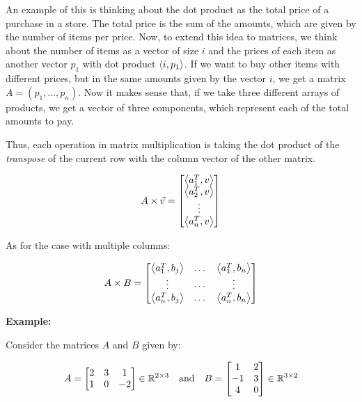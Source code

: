 An example of this is thinking about the dot product as the total price of a purchase in a store.
The total price is the sum of the amounts, which are given by the number of items per price. Now, to extend this idea
to matrices, we think about the number of items as a vector of size \(i\) and the prices of each item as
another vector \(p_1\) with dot product \(\left\langle i, p_1\right\rangle\). If we want to buy other items with different prices, but in the
same amounts given by the vector \(i\), we get a matrix \(A = (p_1, \dots, p_n)\). Now it makes sense that, if
we take three different arrays of products, we get a vector of three components, which represent each of the
total amounts to pay.

Thus, each operation in matrix multiplication is taking the dot product of the \emph{transpose}
of the current row with the column vector of the other matrix.

\[
    A \times \vec{v} =
    \begin{bmatrix}
        \left\langle a_{1}^T, v\right\rangle \\
        \left\langle a_{2}^T, v\right\rangle \\
        \vdots                    \\
        \left\langle a_{n}^T, v\right\rangle
    \end{bmatrix}
\]

As for the case with multiple columns:

\[
    A \times B =
    \begin{bmatrix}
        \left\langle a_{1}^T, b_{j}\right\rangle & \dots  & \left\langle a_{1}^T, b_{n}\right\rangle \\
        \vdots                         & \cdots & \vdots                         \\
        \left\langle a_{n}^T, b_{j}\right\rangle & \dots  & \left\langle a_{n}^T, b_{n}\right\rangle
    \end{bmatrix}
\]

\textbf{Example:}

Consider the matrices \(A\) and \(B\) given by:

\[
    A =
    \begin{bmatrix}
        2 & 3 & 1  \\
        1 & 0 & -2
    \end{bmatrix} \in \mathbb{R}^{2 \times 3}
    \quad \text{and} \quad
    B =
    \begin{bmatrix}
        1  & 2 \\
        -1 & 3 \\
        4  & 0
    \end{bmatrix} \in \mathbb{R}^{3 \times 2}
\]

